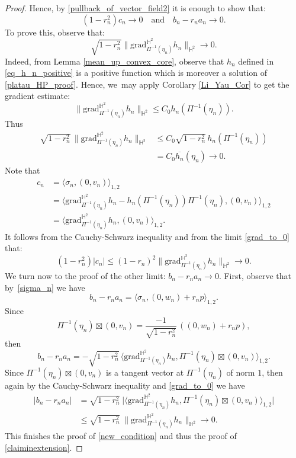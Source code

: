 \documentclass[JEP,XML,SOM,Unicode,NoEqCountersInSection, NoFloatCountersInSection,published]{cedram}
\theoremstyle{plain}
\theoremstyle{definition}
\newcommand{\grad}{\mathrm{grad}^{\mathbb{H}^2}}
\newcommand{\inner}[1] {\langle #1 \rangle}
\begin{document}
\begin{proof}
Hence, by \eqref{pullback_of_vector_field2} it is enough to show that:
\begin{equation}\label{new_condition}
(1 - r_n^2) c_n \to 0 \quad \text{and} \quad b_n - r_n a_n \to 0.
\end{equation}
To prove this, observe that:
\begin{equation}\label{grad_to_0}
\sqrt{1 - r_n^2} \lVert \grad_{\Pi^{-1}(\eta_n)} h_n \rVert_{\mathbb{H}^2} \to 0.
\end{equation}
Indeed, from Lemma \ref{mean_up_convex_core}, observe that \(h_n\) defined in \eqref{eq_h_n_positive} is a positive function which is moreover a solution of \eqref{platau_HP_proof}. Hence, we~may apply Corollary \ref{Li_Yau_Cor} to get the gradient estimate:
\[
\lVert \grad_{\Pi^{-1}(\eta_n)} h_n\rVert_{\mathbb{H}^2}\leq C_0 h_n(\Pi^{-1}(\eta_n)).
\]
Thus \begin{align*}
\sqrt{1-r_n^2}\,\lVert\grad_{\Pi^{-1}(\eta_n)} h_n\rVert_{\mathbb{H}^2}&\leq C_0\sqrt{1-r_n^2}\,h_n(\Pi^{-1}(\eta_n))\\
&=C_0\overline{h_n}(\eta_n)\to 0.
\end{align*}
Note that \begin{align*}
c_n&=\inner{\sigma_n,(0,v_n)}_{1,2}\\
&=\inner{\grad_{\Pi^{-1}(\eta_n)}h_n-h_n(\Pi^{-1}(\eta_n))\Pi^{-1}(\eta_n),(0,v_n)}_{1,2}\\
&= \inner{\grad_{\Pi^{-1}(\eta_n)}h_n,(0,v_n)}_{1,2}.
\end{align*} It follows from the Cauchy-Schwarz inequality and from the limit \eqref{grad_to_0} that:
\[
(1-r_n^2)\lvert c_n\rvert\leq (1-r_n)^2\lVert\grad_{\Pi^{-1}(\eta_n)}h_n\rVert_{\mathbb{H}^2} \to 0.
\]
We turn now to the proof of the other limit: $b_n-r_na_n\to 0$. First, observe that by~\eqref{sigma_n} we have
\[
b_n-r_na_n=\inner{\sigma_n,(0,w_n)+r_np}_{1,2}.
\]
Since
\[
\Pi^{-1}(\eta_n)\boxtimes(0,v_n)=\frac{-1}{\sqrt{1-r_n^2}}\,((0,w_n)+r_np),
\]
then
\[
b_n-r_na_n=-\sqrt{1-r_n^{2}}\,\inner{\grad_{\Pi^{-1}(\eta_n)}h_n,\Pi^{-1}(\eta_n)\boxtimes (0,v_n)}_{1,2}.
\]
Since $\Pi^{-1}(\eta_n)\boxtimes (0,v_n)$ is a tangent vector at $\Pi^{-1}(\eta_n)$ of norm $1$, then again by the Cauchy-Schwarz inequality and \eqref{grad_to_0} we have
\begin{align*}
\lvert b_n-r_na_n\rvert&=\sqrt{1-r_n^{2}}\ \lvert\inner{\grad_{\Pi^{-1}(\eta_n)}h_n,\Pi^{-1}(\eta_n)\boxtimes (0,v_n)}_{1,2}\vert\\
&\leq \sqrt{1-r_n^{2}}\ \lVert \grad_{\Pi^{-1}(\eta_n)}h_n\rVert_{\mathbb{H}^2}\to 0.
\end{align*}
This finishes the proof of \eqref{new_condition} and thus the proof of \eqref{claiminextension}.


\end{proof}
\end{document}

